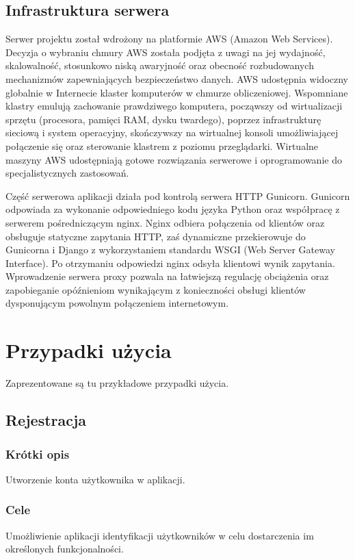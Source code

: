 \documentclass[licencjacka]{pracamgr}
\begin{document}
\newpage
\section{Infrastruktura serwera} 

Serwer projektu został wdrożony na platformie AWS (Amazon Web Services). Decyzja o wybraniu chmury AWS została podjęta z uwagi na jej wydajność, skalowalność, stosunkowo niską awaryjność oraz obecność rozbudowanych mechanizmów zapewniających bezpieczeństwo danych. AWS udostępnia widoczny globalnie w Internecie klaster komputerów w chmurze obliczeniowej. Wspomniane klastry emulują zachowanie prawdziwego komputera, począwszy od wirtualizacji sprzętu (procesora, pamięci RAM, dysku twardego), poprzez infrastrukturę sieciową i system operacyjny, skończywszy na wirtualnej konsoli umożliwiającej połączenie się oraz sterowanie klastrem z poziomu przeglądarki. Wirtualne maszyny AWS udostępniają gotowe rozwiązania serwerowe i oprogramowanie do specjalistycznych zastosowań.

Część serwerowa aplikacji działa pod kontrolą serwera HTTP Gunicorn. Gunicorn odpowiada za wykonanie odpowiedniego kodu języka Python oraz współpracę z serwerem pośredniczącym nginx. Nginx odbiera połączenia od klientów oraz obsługuje statyczne zapytania HTTP, zaś dynamiczne przekierowuje do Gunicorna i Django z wykorzystaniem standardu WSGI (Web Server Gateway Interface). Po otrzymaniu odpowiedzi nginx odsyła klientowi wynik zapytania. Wprowadzenie serwera proxy pozwala na łatwiejszą regulację obciążenia oraz zapobieganie opóźnieniom wynikającym z konieczności obsługi klientów dysponującym powolnym połączeniem internetowym.

\chapter{Przypadki użycia}\label{r:usecase}
Zaprezentowane są tu przykładowe przypadki użycia.
\section{Rejestracja}
    \subsection{Krótki opis}
    Utworzenie konta użytkownika w aplikacji.
    \subsection{Cele}
    Umożliwienie aplikacji identyfikacji użytkowników w celu dostarczenia im określonych funkcjonalności.
\end{document}
